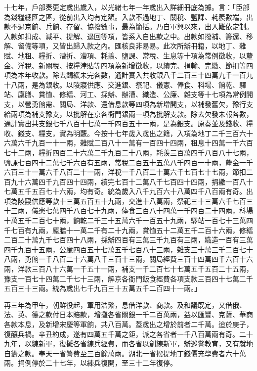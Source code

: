 \begin{pinyinscope}
十七年，戶部奏更定歲出歲入，以光緒七年一年歲出入詳細冊底為據。言：「臣部為錢糧總匯之區，從前出入均有定額。入款不過地丁、關稅、鹽課、耗羨數端，出款不過京餉、兵餉、存留、協撥數事，最為簡括。乃自軍興以來，出入難依定制。入款如扣成、減平、提解、退回等項，皆系入自出款之中。出款如撥補、籌還、移解、留備等項，又皆出歸入款之內。匯核良非易易。此次所辦冊籍，以地丁、雜賦、地租、糧折、漕折、漕項、耗羨、鹽課、常稅、生息等十項為常例徵收，以釐金、洋稅、新關稅、按糧津貼等四項為新增徵收，以續完、捐輸、完繳、節扣等四項為本年收款。除去蠲緩未完各數，通計實入共收銀八千二百三十四萬九千一百九十八兩，是為銀收。以陵寢供應、交進銀、祭祀、儀憲、俸食、科場、餉乾、驛站、廩膳、賞恤、修繕、河工、採辦、辦漕、織造、公廉、雜支等十七項為常例開支，以營勇餉需、關局、洋款、還借息款等四項為新增開支，以補發舊欠，豫行支給兩項為補支豫支，以批解在京各衙門銀兩一項為批解支款。除去欠發未報各數，通計實出共支銀七千八百十七萬一千四百五十一兩，是為銀支。原奏並及錢收、糧收、錢支、糧支，實為明覈。今按十七年歲入歲出之籍，入項為地丁二千三百六十六萬六千九百一十一兩，雜賦二百八十一萬有一百四十四兩，租息十四萬一千六百七十二兩，糧折四百二十六萬二千九百二十八兩，耗羨三百萬四千八百八十七兩，鹽課七百四十二萬七千六百有五兩，常稅二百五十五萬八千四百一十兩，釐金一千六百三十一萬六千八百二十一兩，洋稅一千八百二十萬六千七百七十七兩，節扣二百九十六萬四千九百四十四兩，續完七百十二萬八千七百四十四兩，捐繳一百八十七萬五千五百七十六兩，均有奇。統為歲入八千九百六十八萬四千八百兩有奇。出項為陵寢供應等款十三萬五百五十九兩，交進十八萬兩，祭祀三十三萬六千七百三十三兩，儀憲七萬四千八百七十九兩，俸食三百八十四萬一千四百二十四兩，科場十萬五千二百七十兩，餉乾二千三十五萬六千一百五十九兩，驛站一百七十三萬四千七百有九兩，廩膳十一萬二千有二十九兩，賞恤五十二萬五千二百十六兩，修繕二百二十萬九千七百四十八兩，採辦四百有三萬三千九百有三兩，織造一百有三萬四千九百十五兩，公廉四百五十七萬五千七百八十三兩，雜支三十萬三千二百七十八兩，勇餉一千八百二十六萬八千三百十三兩，關局經費三百十四萬四千六百十六兩，洋款三百八十六萬一千五十一兩，補支一千二百七十七萬五千五百二十五兩，豫支一百七十四萬二千七十三兩，解京各衙門飯食經費各項支款三百四十七萬二千五百三十三兩。統為歲出七千九百三十五萬五千二百四十一兩。」

再三年為甲午，朝鮮役起，軍用浩繁，息借洋款、商款。及和議既定，又借俄、法、英、德之款付日本賠款，增攤各省關銀一千二百萬兩，益以匯豐、克薩、華商各款本息，及新增宋慶等軍餉，共八百萬。蓋歲出之增於前者二千萬。迨於庚子，復釀兵禍。辛丑約成，遂有四萬五千萬之鉅，派之各省者一千八百萬兩有奇。二十九年，以練新軍，復攤各省練兵經費，而各省以創練新軍，辦巡警教育，又有就地自籌之款。奉天一省警費至三百餘萬兩。湖北一省撥提地丁錢價充學費者六十萬兩。捐例停於二十七年，以練兵復開，至三十二年復停。


\end{pinyinscope}
